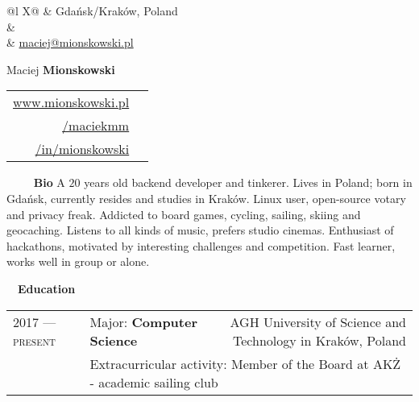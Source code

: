 \documentclass[a4paper, 11pt]{article}
\newcommand{\sectitle}[2]{\large{#1} \ \ \Large{\textbf{#2}}}
\begin{document}
	\pagestyle{fancy}

	\begin{center}
	\begin{multicols}{3}
		\begin{tabularx}{\linewidth}{@{}l X@{}}
			\faMapMarker & Gdańsk/Kraków, Poland \\
			\IfFileExists{confidential.tex}{\faPhone & \href{tel:\phoneNumber}{\prettyPhoneNumber} \\}{}
			\faEnvelope	 & \href{mailto:maciej@mionskowski.pl}{maciej@mionskowski.pl} \\
		\end{tabularx} \vfill \null

		\columnbreak
			{\Huge{Maciej \textbf{Mionskowski}}}
		\columnbreak

		\begin{tabularx}{\linewidth}{R | r}
				\href{https://www.mionskowski.pl}{www.mionskowski.pl} & \faLink \\
				\href{https://www.github.com/maciekmm}{/maciekmm} & \faGithub \\
				\href{https://www.linkedin.com/in/mionskowski}{/in/mionskowski} & \faLinkedin \\
		\end{tabularx} \vfill \null
	\end{multicols}
	\end{center}

	\begin{section}{\sectitle{\ \faUser}{\ Bio}}
		A $20$ years old backend developer and tinkerer. Lives in Poland; born in Gdańsk, currently resides and studies in Kraków. Linux user, open-source votary and privacy freak. Addicted to board games, cycling, sailing, skiing and geocaching. Listens to all kinds of music, prefers studio cinemas. Enthusiast of hackathons, motivated by interesting challenges and competition. Fast learner, works well in group or alone.
	\end{section}

	\newcommand{\education}[6]{
		\textsc{#1 --- #2} & #3: \textbf{#4} & \small{#5} \\[-0.5ex]
		\ & \multicolumn{2}{l}{\footnotesize Extracurricular activity: #6}\\
	}

	\begin{section}{\sectitle{\faGraduationCap}{Education}}
		\begin{tabularx}{\linewidth}{@{}p{2.9cm} | X  r}
			\education{2017}{present}{Major}{Computer Science}{AGH University of Science and Technology in Kraków, Poland}{Member of the Board at AKŻ - academic sailing club }
		\end{tabularx}
	\end{section}
\end{document}
